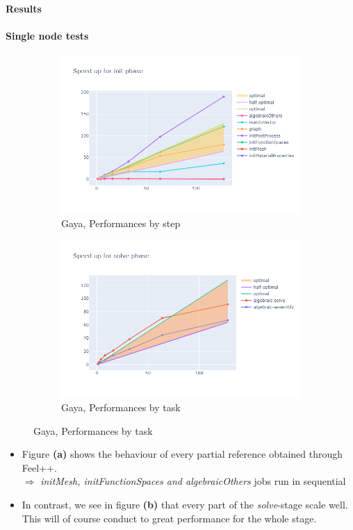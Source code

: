 \documentclass[10pt]{beamer}
\begin{document}
\begin{frame}{\textbf{Results}}
    \framesubtitle{\textbf{Single node tests}}
    \begin{figure}[h]
        \centering
        \begin{subfigure}{0.49\textwidth}
          \centering
          \includegraphics[width=\textwidth]{../illustrations/gaya-graphs/gayaInit.png}
          \caption{Gaya, Performances by step}
        \end{subfigure}
        \begin{subfigure}{0.49\textwidth}
          \centering
          \includegraphics[width=\textwidth]{../illustrations/gaya-graphs/gayaSolve.png}
          \caption{Gaya, Performances by task}
        \end{subfigure}
      \end{figure}

      \begin{itemize}
        \item Figure \textbf{(a)} shows the behaviour of every partial reference obtained through Feel++. \\
                $ \Rightarrow $ \textit{initMesh, initFunctionSpaces and algebraicOthers} jobs run in sequential \\
        \item In contrast, we see in figure \textbf{(b)} that every part of the \textit{solve}-stage scale well. This will of course conduct to great performance for the whole stage.
      \end{itemize}
\end{frame}
\end{document}

